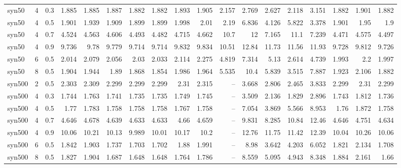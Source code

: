 \begin{table}
\begin{tabular}{lrrrrrrrrrrrrrrrrr}
syn50 & 4 & 0.3 & 1.885 & 1.885 & 1.887 & 1.882 & 1.882 & 1.893 & 1.905 & 2.157 & 2.769 & 2.627 & 2.118 & 3.151 & 1.882 & 1.901 & 1.882 \\
syn50 & 4 & 0.5 & 1.901 & 1.939 & 1.909 & 1.899 & 1.899 & 1.998 & 2.01 & 2.19 & 6.836 & 4.126 & 5.822 & 3.378 & 1.901 & 1.95 & 1.9 \\
syn50 & 4 & 0.7 & 4.524 & 4.563 & 4.606 & 4.493 & 4.482 & 4.715 & 4.662 & 10.7 & 12 & 7.165 & 11.1 & 7.239 & 4.471 & 4.575 & 4.497 \\
syn50 & 4 & 0.9 & 9.736 & 9.78 & 9.779 & 9.714 & 9.714 & 9.832 & 9.834 & 10.51 & 12.84 & 11.73 & 11.56 & 11.93 & 9.728 & 9.812 & 9.726 \\
syn50 & 6 & 0.5 & 2.014 & 2.079 & 2.056 & 2.03 & 2.033 & 2.114 & 2.275 & 4.819 & 7.314 & 5.13 & 2.614 & 4.739 & 1.993 & 2.2 & 1.997 \\
syn50 & 8 & 0.5 & 1.904 & 1.944 & 1.89 & 1.868 & 1.854 & 1.986 & 1.964 & 5.535 & 10.4 & 5.839 & 3.515 & 7.887 & 1.923 & 2.106 & 1.882 \\
syn500 & 2 & 0.5 & 2.303 & 2.309 & 2.299 & 2.299 & 2.299 & 2.31 & 2.315 & -- & 3.668 & 2.806 & 2.465 & 3.833 & 2.299 & 2.31 & 2.299 \\
syn500 & 4 & 0.3 & 1.744 & 1.763 & 1.741 & 1.735 & 1.735 & 1.749 & 1.745 & -- & 3.509 & 2.136 & 1.829 & 2.896 & 1.743 & 1.812 & 1.736 \\
syn500 & 4 & 0.5 & 1.77 & 1.783 & 1.758 & 1.758 & 1.758 & 1.767 & 1.758 & -- & 7.054 & 3.869 & 5.566 & 8.953 & 1.76 & 1.872 & 1.758 \\
syn500 & 4 & 0.7 & 4.646 & 4.678 & 4.639 & 4.633 & 4.633 & 4.66 & 4.659 & -- & 9.831 & 8.285 & 10.84 & 12.46 & 4.646 & 4.751 & 4.634 \\
syn500 & 4 & 0.9 & 10.06 & 10.21 & 10.13 & 9.989 & 10.01 & 10.17 & 10.2 & -- & 12.76 & 11.75 & 11.42 & 12.39 & 10.04 & 10.26 & 10.06 \\
syn500 & 6 & 0.5 & 1.842 & 1.903 & 1.737 & 1.703 & 1.702 & 1.88 & 1.991 & -- & 8.98 & 3.642 & 4.203 & 6.052 & 1.821 & 2.134 & 1.708 \\
syn500 & 8 & 0.5 & 1.827 & 1.904 & 1.687 & 1.648 & 1.648 & 1.764 & 1.786 & -- & 8.559 & 5.095 & 4.943 & 8.348 & 1.884 & 2.161 & 1.66 \\
\bottomrule
\end{tabular}
\end{table}

